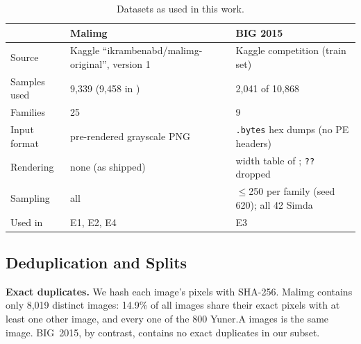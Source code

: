 \documentclass[conference]{IEEEtran}
\begin{document}
\begin{table}[t]
\centering
\caption{Datasets as used in this work.}
\label{tab:datasets}
\small
\begin{tabular}{lll}
\toprule
 & Malimg \cite{nataraj2011images} & BIG 2015 \cite{ronen2018big2015} \\
\midrule
Source & Kaggle ``ikrambenabd/malimg-original'', version 1 & Kaggle competition (train set) \\
Samples used & 9,339 (9,458 in \cite{nataraj2011images}) & 2,041 of 10,868 \\
Families & 25 & 9 \\
Input format & pre-rendered grayscale PNG & \texttt{.bytes} hex dumps (no PE headers) \\
Rendering & none (as shipped) & width table of \cite{nataraj2011images}; \texttt{??} dropped \\
Sampling & all & $\le$250 per family (seed 620); all 42 Simda \\
Used in & E1, E2, E4 & E3 \\
\bottomrule
\end{tabular}
\end{table}

\subsection{Deduplication and Splits}
\textbf{Exact duplicates.} We hash each image's pixels with SHA-256.
Malimg contains only 8,019 distinct images: 14.9\% of all images share their exact
pixels with at least one other image, and every one of the 800 Yuner.A images is the
same image.
BIG~2015, by contrast, contains no exact duplicates in our subset.
\end{document}
